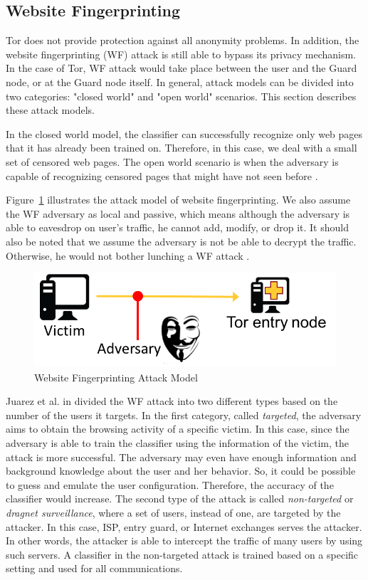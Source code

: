 \subsection{Website Fingerprinting}

Tor does not provide protection against all anonymity problems.
In addition, the website fingerprinting (WF) attack is still able to bypass its privacy mechanism.
In the case of Tor, WF attack would take place between the user and the Guard node, or at the Guard node itself.
In general, attack models can be divided into two categories: "closed world" and "open world" scenarios.
This section describes these attack models.

In the closed world model, the classifier can successfully recognize only web pages that it has already been trained on.
Therefore, in this case, we deal with a small set of censored web pages.
The open world scenario is when the adversary is capable of recognizing censored pages that might have not seen before \cite{TorBlog}.


Figure~\ref{fig:attack} illustrates the attack model of website fingerprinting.
We also assume the WF adversary as local and passive, which means although the adversary is able to eavesdrop on user's traffic, he cannot add, modify, or drop it.
It should also be noted that we assume the adversary is not be able to decrypt the traffic.
Otherwise, he would not bother lunching a WF attack \cite{juarez14}.

\begin{figure}[h]
\includegraphics[width=0.7\columnwidth]{figures/attack_model.png}
\centering
\caption{Website Fingerprinting Attack Model~\cite{juarez14}}
\label{fig:attack}
\end{figure}

Juarez et al. in \cite{juarez14} divided the WF attack into two different types based on the number of the users it targets.
In the first category, called \emph{targeted}, the adversary aims to obtain the browsing activity of a specific victim.
In this case, since the adversary is able to train the classifier using the information of the victim, the attack is more successful.
The adversary may even have enough information and background knowledge about the user and her behavior.
So, it could be possible to guess and emulate the user configuration.
Therefore, the accuracy of the classifier would increase.
The second type of the attack is called \emph{non-targeted} or \emph{dragnet surveillance}, where a set of users, instead of one, are targeted by the attacker.
In this case, ISP, entry guard, or Internet exchanges serves the attacker.
In other words, the attacker is able to intercept the traffic of many users by using such servers.
A classifier in the non-targeted attack is trained based on a specific setting and used for all communications.


